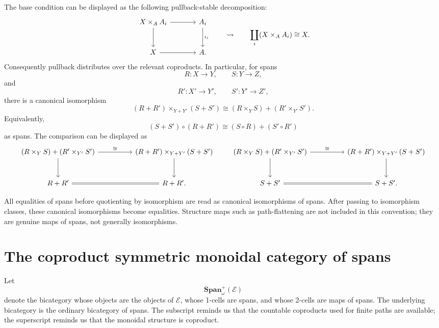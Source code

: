 The base condition can be displayed as the following pullback-stable
decomposition:
\[
\begin{tikzcd}[column sep=large,row sep=large]
  X\times_A A_i
    \ar[r]
    \ar[d]
  &
  A_i
    \ar[d,"\iota_i"]
  \\
  X
    \ar[r]
  &
  A .
\end{tikzcd}
\qquad
\leadsto
\qquad
\coprod_i(X\times_A A_i)\cong X .
\]
Consequently pullback distributes over the relevant coproducts. In particular,
for spans
\[
  R:X\to Y,
  \qquad
  S:Y\to Z,
\]
and
\[
  R':X'\to Y',
  \qquad
  S':Y'\to Z',
\]
there is a canonical isomorphism
\[
  (R+R')\times_{Y+Y'}(S+S')
  \cong
  (R\times_Y S)+(R'\times_{Y'}S').
\]
Equivalently,
\[
  (S+S')\circ(R+R')
  \cong
  (S\circ R)+(S'\circ R')
\]
as spans. The comparison can be displayed as
\[
\begin{tikzcd}[column sep=huge,row sep=large]
  (R\times_Y S)+(R'\times_{Y'}S')
    \ar[r,"\cong"]
    \ar[d]
  &
  (R+R')\times_{Y+Y'}(S+S')
    \ar[d]
  \\
  R+R'
    \ar[r,equal]
  &
  R+R' .
\end{tikzcd}
\qquad
\begin{tikzcd}[column sep=huge,row sep=large]
  (R\times_Y S)+(R'\times_{Y'}S')
    \ar[r,"\cong"]
    \ar[d]
  &
  (R+R')\times_{Y+Y'}(S+S')
    \ar[d]
  \\
  S+S'
    \ar[r,equal]
  &
  S+S' .
\end{tikzcd}
\]

All equalities of spans before quotienting by isomorphism are read as
canonical isomorphisms of spans. After passing to isomorphism classes, these
canonical isomorphisms become equalities. Structure maps such as path-flattening are not included in this convention;
they are genuine maps of spans, not generally isomorphisms.

\section{The coproduct symmetric monoidal category of spans}
\label{sec:coproduct-symmetric-monoidal-category-spans}

Let
\[
  \mathbf{Span}^{+}_{\omega}(\mathcal E)
\]
denote the bicategory whose objects are the objects of \(\mathcal E\), whose
1-cells are spans, and whose 2-cells are maps of spans. The underlying
bicategory is the ordinary bicategory of spans. The subscript reminds us that
the countable coproducts used for finite paths are available; the superscript
reminds us that the monoidal structure is coproduct.


